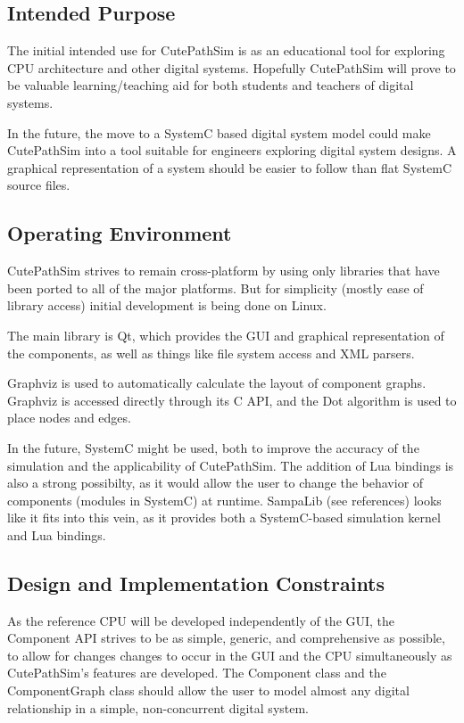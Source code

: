 \documentclass[12pt]{article}
\begin{document}
\subsection{Intended Purpose}
The initial intended use for CutePathSim is as an educational tool for exploring CPU architecture and other digital systems. Hopefully CutePathSim will prove to be valuable learning/teaching aid for both students and teachers of digital systems.

In the future, the move to a SystemC based digital system model could make CutePathSim into a tool suitable for engineers exploring digital system designs. A graphical representation of a system should be easier to follow than flat SystemC source files.

\subsection{Operating Environment}
CutePathSim strives to remain cross-platform by using only libraries that have been ported to all of the major platforms. But for simplicity (mostly ease of library access) initial development is being done on Linux.

The main library is Qt, which provides the GUI and graphical representation of the components, as well as things like file system access and XML parsers.

Graphviz is used to automatically calculate the layout of component graphs. Graphviz is accessed directly through its C API, and the Dot algorithm is used to place nodes and edges.

In the future, SystemC might be used, both to improve the accuracy of the simulation and the applicability of CutePathSim. The addition of Lua bindings is also a strong possibilty, as it would allow the user to change the behavior of components (modules in SystemC) at runtime. SampaLib (see references) looks like it fits into this vein, as it provides both a SystemC-based simulation kernel and Lua bindings.

\subsection{Design and Implementation Constraints}
As the reference CPU will be developed independently of the GUI, the Component API strives to be as simple, generic, and comprehensive as possible, to allow for changes changes to occur in the GUI and the CPU simultaneously as CutePathSim’s features are developed. The Component class and the ComponentGraph class should allow the user to model almost any digital relationship in a simple, non-concurrent digital system.
\end{document}
